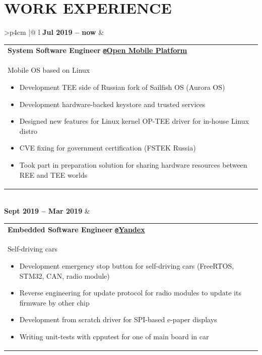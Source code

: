 \documentclass{anisyan-resume}
\begin{document}
	\section{\textbf{WORK EXPERIENCE}}
	\vspace{10pt}
	\renewcommand\arraystretch{0.5}
	\begin{tabularx}{\textwidth}{>{\quad}p{4cm} |@{\timelinebullet} l}
		\normalsize\textbf{Jul 2019 -- now}
		&
		\renewcommand\arraystretch{1}
		\begin{tabular}[t]{ p{15cm} }
			\large{\textbf{System Software Engineer}} \texttt{\textbf{@}}\href{https://sailfishos.org/}{\textbf{Open Mobile Platform}} \\
			\normalsize{Mobile OS based on Linux}
			\renewcommand\labelitemi{{\boldmath$\cdot$}}
			\begin{itemize}[noitemsep, topsep=5pt, parsep=0pt, partopsep=0pt]
				\item {\small Development TEE side of Russian fork of Sailfish OS (Aurora OS)}
				\item {\small Development hardware-backed keystore and trusted services}
				\item {\small Designed new features for Linux kernel OP-TEE driver for in-house Linux distro}
				\item {\small CVE fixing for government certification (FSTEK Russia)}
				\item {\small Took part in preparation solution for sharing hardware resources between REE and TEE worlds}
			\end{itemize}
		\end{tabular} \\

		\normalsize\textbf{Sept 2019 -- Mar 2019}
		&
		\renewcommand\arraystretch{1}
		\begin{tabular}[t]{ p{15cm} }
			\large{\textbf{Embedded Software Engineer}} \texttt{\textbf{@}}\href{https://en.wikipedia.org/wiki/Yandex}{\textbf{Yandex}}\\
			\normalsize{Self-driving cars}
			\renewcommand\labelitemi{{\boldmath$\cdot$}}
			\begin{itemize}[noitemsep, topsep=5pt, parsep=0pt, partopsep=0pt]
				\item {\small Development emergency stop button for self-driving cars (FreeRTOS, STM32, CAN, radio module)}
				\item {\small Reverse engineering for update protocol for radio modules to update its firmware by other chip}
				\item {\small Development from scratch driver for SPI-based e-paper displays}
				\item {\small Writing unit-tests with cpputest for one of main board in car}
			\end{itemize}
		\end{tabular} \\


\end{tabularx}
\end{document}
